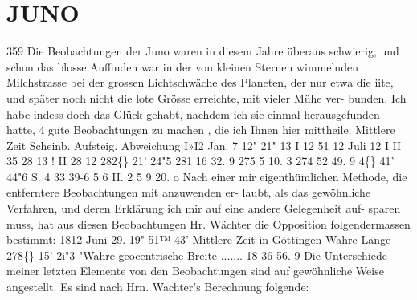 \documentclass[12pt,a4paper]{article}
\newcommand{\degree}{\textdegree}
\begin{document}
\newpage

\section*{JUNO}
359 
Die  Beobachtungen  der  Juno  waren  in  diesem  Jahre  überaus  schwierig,  und  schon  das  blosse 
Auffinden  war  in  der  von  kleinen  Sternen  wimmelnden  Milchstrasse  bei  der  grossen  Lichtschwäche  des 
Planeten,  der  nur  etwa  die  iite,  und  später  noch  nicht  die  lote  Grösse  erreichte,  mit  vieler  Mühe  ver- 
bunden. Ich  habe  indess  doch  das  Glück  gehabt,  nachdem  ich  sie  einmal  herausgefunden  hatte,  4  gute 
Beobachtungen  zu  machen ,  die  ich  Ihnen  hier  mittheile. 
Mittlere  Zeit    Scheinb.  Aufsteig.      Abweichung 
I»I2 
Jan.  7  12"  21" 
13  I  12   51  12 
Juli  12  I  II  35  28 
13  !  II   28  12 
282\degree\{\}  21'  24"5 
281  16  32. 9 
275   5  10. 3 
274  52  49. 9 
4\degree\{\}  41'  44"6  S. 
4  33  39-6 
5  6  II.  2 
5       9  20.  o 
Nach  einer  mir  eigenthümlichen  Methode,  die  entferntere  Beobachtungen  mit  anzuwenden  er- 
laubt, als  das  gewöhnliche  Verfahren,  und  deren  Erklärung  ich  mir  auf  eine  andere  Gelegenheit  auf- 
sparen muss,  hat  aus  diesen  Beobachtungen  Hr.  Wächter  die  Opposition  folgendermassen  bestimmt: 
1812  Juni  29.  19"  51™  43'  Mittlere  Zeit  in  Göttingen 
Wahre  Länge   
278\degree\{\}  15'    2i"3 
"Wahre  geocentrische  Breite   .......      18     36     56. 9 
Die  Unterschiede  meiner  letzten  Elemente  von  den  Beobachtungen  sind  auf  gewöhnliche  Weise 
angestellt.     Es  sind  nach  Hrn.  Wachter's  Berechnung  folgende: 
\end{document}
